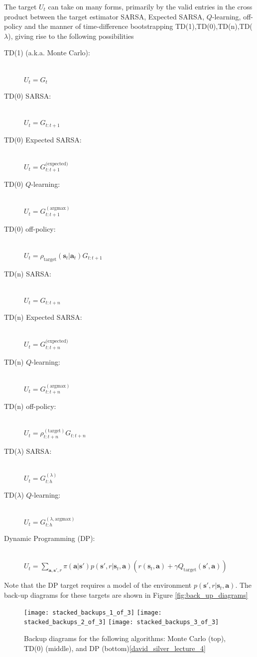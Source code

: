 \documentclass{article}
\begin{document}
The target $U_t$ can take on many forms, primarily by the valid entries in the cross product between the target estimator {SARSA, Expected SARSA, $Q$-learning, off-policy} and the manner of time-difference bootstrapping {TD(1),TD(0),TD(n),TD($\lambda$)}, giving rise to the following possibilities
 \begin{description}
\item[TD(1) (a.k.a. Monte Carlo):]\hfill \\ 
$U_t=G_t$
\item[TD(0) SARSA:]\hfill \\ 
$U_t=G_{t:t+1}$
\item[TD(0) Expected SARSA:]\hfill \\ 
$U_t=G_{t:t+1}^\text{(expected)}$
\item[TD(0) $Q$-learning:]\hfill \\ 
$U_t=G_{t:t+1}^{(\text{argmax})}$
\item[TD(0) off-policy:]\hfill \\ 
$U_t=\rho_\text{target}(\mathbf{s}_t|\mathbf{a}_t)G_{t:t+1}$
\item[TD(n) SARSA:]\hfill \\
$U_t=G_{t:t+n}$
\item[TD(n) Expected SARSA:]\hfill \\
$U_t=G_{t:t+n}^\text{(expected)}$
\item[TD(n) $Q$-learning:]\hfill \\
$U_t=G_{t:t+n}^{(\text{argmax})}$
\item[TD(n) off-policy:]\hfill \\ 
$U_t=\rho_{t:t+n}^{(\text{target})}G_{t:t+n}$
\item[TD($\lambda$) SARSA:]\hfill \\ 
$U_t=G_{t:h}^{(\lambda)}$
\item[TD($\lambda$) $Q$-learning:]\hfill \\ 
$U_t=G_{t:h}^{(\lambda,\text{argmax})}$
\item[Dynamic Programming (DP):]\hfill \\ 
$U_t=\sum_{\mathbf{a},\mathbf{s}',r}\pi(\mathbf{a}|\mathbf{s}')p(\mathbf{s}',r|\mathbf{s}_t,\mathbf{a})\left(r(\mathbf{s}_t,\mathbf{a})+\gamma Q_\text{target}(\mathbf{s}',\mathbf{a})\right)$
\end{description}Note that the DP target requires a model of the environment $p(\mathbf{s}',r|\mathbf{s}_t,\mathbf{a})$. The back-up diagrams for these targets are shown in Figure \ref{fig:back_up_diagrams}

\begin{figure}
\label{fig:back_up_diagrams}
    \begin{center}
    \texttt{[image: stacked\_backups\_1\_of\_3]}
    \texttt{[image: stacked\_backups\_2\_of\_3]}
    \texttt{[image: stacked\_backups\_3\_of\_3]}
    \caption{Backup diagrams for the following algorithms: Monte Carlo (top), TD(0) (middle), and DP (bottom)\ref{david_silver_lecture_4}}
    \label{fig:basis_small_width}
    \end{center}
\end{figure}
\end{document}
